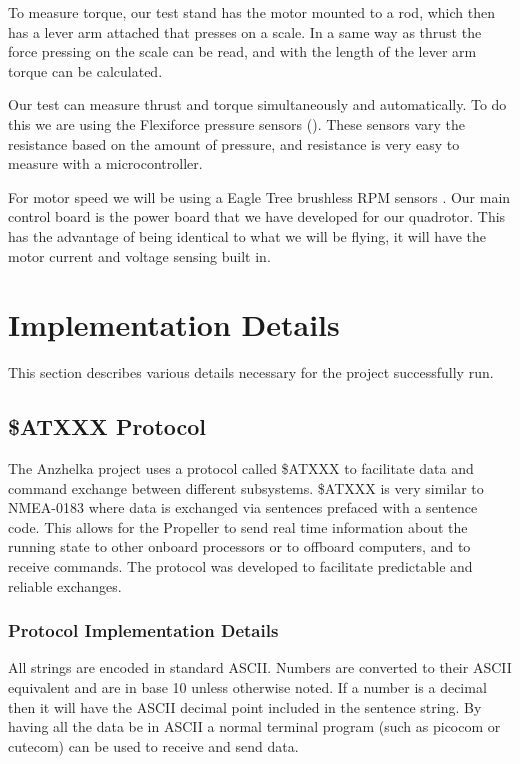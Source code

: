 \documentclass{article}
\numberwithin{equation}{section} %
\begin{document}
To measure torque, our test stand has the motor mounted to a rod, which then has a lever arm attached that presses on a scale. In a same way as thrust the force pressing on the scale can be read, and with the length of the lever arm torque can be calculated.

Our test can measure thrust and torque simultaneously and automatically. To do this we are using the Flexiforce pressure sensors (\cite{tekscanforce}). These sensors vary the resistance based on the amount of pressure, and resistance is very easy to measure with a microcontroller.

For motor speed we will be using a Eagle Tree brushless RPM sensors \cite{eaglerpm}. Our main control board is the power board that we have developed for our quadrotor. This has the advantage of being identical to what we will be flying, it will have the motor current and voltage sensing built in.



\section{Implementation Details}
This section describes various details necessary for the project successfully run.

\subsection{\$ATXXX Protocol} \label{subsec:anzhelkadataandcommandexchangeprotocol}

The Anzhelka project uses a protocol called \$ATXXX to facilitate data and command exchange between different subsystems. \$ATXXX is very similar to NMEA-0183 where data is exchanged via sentences prefaced with a sentence code. This allows for the Propeller to send real time information about the running state to other onboard processors or to offboard computers, and to receive commands. The protocol was developed to facilitate predictable and reliable exchanges.

\subsubsection{Protocol Implementation Details}
All strings are encoded in standard ASCII. Numbers are converted to their ASCII equivalent and are in base 10 unless otherwise noted. If a number is a decimal then it will have the ASCII decimal point included in the sentence string. By having all the data be in ASCII a normal terminal program (such as picocom or cutecom) can be used to receive and send data. 
\end{document}
